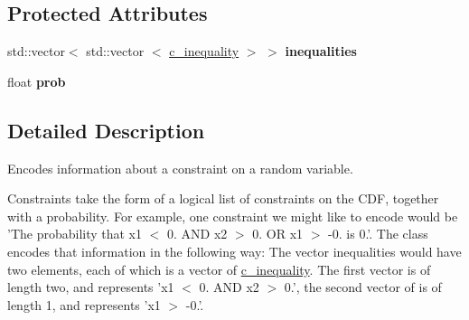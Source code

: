 \subsection*{\-Protected \-Attributes}
\begin{DoxyCompactItemize}
\item 
\hypertarget{classdivopt_1_1c__constraint_ae258c9e1b09282acface0b4172d3376d}{std\-::vector$<$ std\-::vector\*
$<$ \hyperlink{classdivopt_1_1c__inequality}{c\-\_\-inequality} $>$ $>$ {\bfseries inequalities}}\label{classdivopt_1_1c__constraint_ae258c9e1b09282acface0b4172d3376d}

\item 
\hypertarget{classdivopt_1_1c__constraint_a7cb45c815580f9f58a02ad58c9497fa0}{float {\bfseries prob}}\label{classdivopt_1_1c__constraint_a7cb45c815580f9f58a02ad58c9497fa0}

\end{DoxyCompactItemize}


\subsection{\-Detailed \-Description}
\-Encodes information about a constraint on a random variable. 

\-Constraints take the form of a logical list of constraints on the \-C\-D\-F, together with a probability. \-For example, one constraint we might like to encode would be '\-The probability that x1 $<$ 0. \-A\-N\-D x2 $>$ 0. \-O\-R x1 $>$ -\/0. is 0.'. \-The class encodes that information in the following way\-: \-The vector inequalities would have two elements, each of which is a vector of {\ttfamily \hyperlink{classdivopt_1_1c__inequality}{c\-\_\-inequality}}. \-The first vector is of length two, and represents 'x1 $<$ 0. \-A\-N\-D x2 $>$ 0.', the second vector of is of length 1, and represents 'x1 $>$ -\/0.'. 

